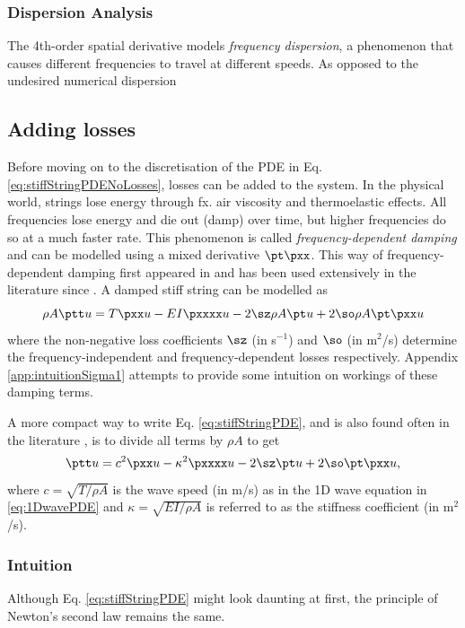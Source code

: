 \subsubsection{Dispersion Analysis}
The 4th-order spatial derivative models \textit{frequency dispersion}, a phenomenon that causes different frequencies to travel at different speeds. As opposed to the undesired numerical dispersion 

\subsection{Adding losses}
Before moving on to the discretisation of the PDE in Eq. \eqref{eq:stiffStringPDENoLosses}, losses can be added to the system. In the physical world, strings lose energy through fx. air viscosity and thermoelastic effects. All frequencies lose energy and die out (damp) over time, but higher frequencies do so at a much faster rate. This phenomenon is called \textit{frequency-dependent damping} and can be modelled using a mixed derivative $\pt \pxx$. This way of frequency-dependent damping first appeared in \cite{Bensa2003} and has been used extensively in the literature since \cite{Valimaki2006,theBible}. A damped stiff string can be modelled as
\begin{equation}\label{eq:stiffStringPDE}
    \rho A \ptt u = T \pxx u - EI \pxxxx u - 2 \sz \rho A \pt u + 2 \so \rho A\pt \pxx u
\end{equation}
where the non-negative loss coefficients $\sz$ (in s$^{-1}$) and $\so$ (in m$^2$/s) determine the frequency-independent and frequency-dependent losses respectively. Appendix \ref{app:intuitionSigma1} attempts to provide some intuition on workings of these damping terms.

A more compact way to write Eq. \eqref{eq:stiffStringPDE}, and is also found often in the literature \cite{theBible}, is to divide all terms by $\rho A$ to get
\begin{equation}\label{eq:stiffStringPDECompact}
    \ptt u = c^2 \pxx u - \kappa^2 \pxxxx u - 2 \sz \pt u + 2 \so \pt \pxx u,
\end{equation}
where $c=\sqrt{T/\rho A}$ is the wave speed  (in m/s) as in the 1D wave equation in \eqref{eq:1DwavePDE} and $\kappa = \sqrt{EI / \rho A}$ is referred to as the stiffness coefficient (in m$^2$/s). 

\subsubsection{Intuition}
Although Eq. \eqref{eq:stiffStringPDE} might look daunting at first, the principle of Newton's second law remains the same. 

